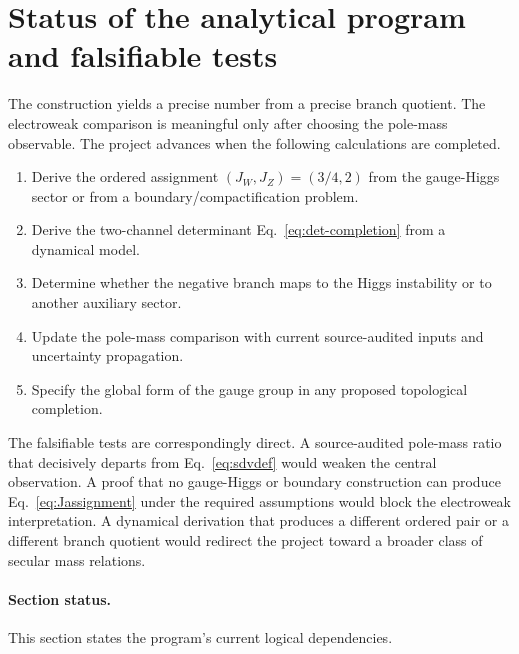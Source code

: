 \section{Status of the analytical program and falsifiable tests}
\label{sec:status-tests}

The construction yields a precise number from a precise branch quotient.  The electroweak comparison is meaningful only after choosing the pole-mass observable.  The project advances when the following calculations are completed.

\begin{enumerate}
\item Derive the ordered assignment \((J_W,J_Z)=(3/4,2)\) from the gauge-Higgs sector or from a boundary/compactification problem.
\item Derive the two-channel determinant Eq.~\eqref{eq:det-completion} from a dynamical model.
\item Determine whether the negative branch maps to the Higgs instability or to another auxiliary sector.
\item Update the pole-mass comparison with current source-audited inputs and uncertainty propagation.
\item Specify the global form of the gauge group in any proposed topological completion.
\end{enumerate}

The falsifiable tests are correspondingly direct.  A source-audited pole-mass ratio that decisively departs from Eq.~\eqref{eq:sdvdef} would weaken the central observation.  A proof that no gauge-Higgs or boundary construction can produce Eq.~\eqref{eq:Jassignment} under the required assumptions would block the electroweak interpretation.  A dynamical derivation that produces a different ordered pair or a different branch quotient would redirect the project toward a broader class of secular mass relations.

\paragraph*{Section status.}  This section states the program's current logical dependencies.
